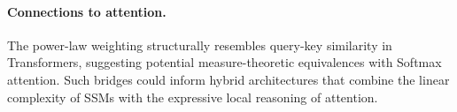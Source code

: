 \documentclass{article}
\theoremstyle{plain}
\theoremstyle{definition}
\theoremstyle{remark}
\begin{document}
\paragraph{Connections to attention.}
The power-law weighting structurally resembles query-key similarity in Transformers,
suggesting potential measure-theoretic equivalences with Softmax attention.
Such bridges could inform hybrid architectures that combine the linear complexity of SSMs
with the expressive local reasoning of attention.

%
%
%
%
\end{document}
